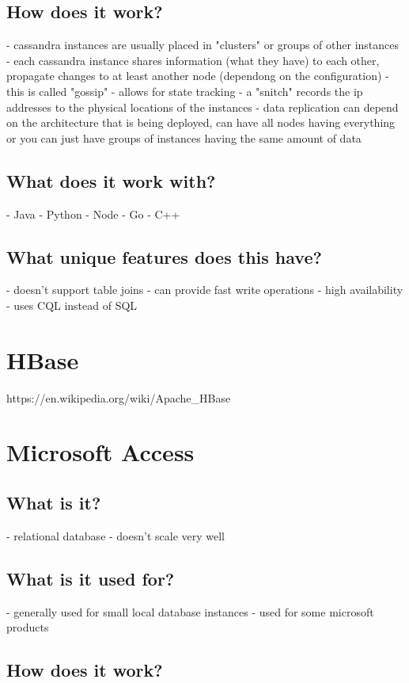 \section{How does it work?}
- cassandra instances are usually placed in "clusters" or groups of other instances
- each cassandra instance shares information (what they have) to each other, propagate changes to at least another node (dependong on the configuration) - this is called "gossip" - allows for state tracking
- a "snitch" records the ip addresses to the physical locations of the instances
- data replication can depend on the architecture that is being deployed, can have all nodes having everything or you can just have groups of instances having the same amount of data

\section{What does it work with?}
- Java
- Python
- Node
- Go
- C++

\section{What unique features does this have?}
- doesn't support table joins
- can provide fast write operations
- high availability
- uses CQL instead of SQL

\chapter{HBase}
https://en.wikipedia.org/wiki/Apache_HBase


\chapter{Microsoft Access}

\section{What is it?}
- relational database
- doesn't scale very well

\section{What is it used for?}
- generally used for small local database instances
- used for some microsoft products

\section{How does it work?}

